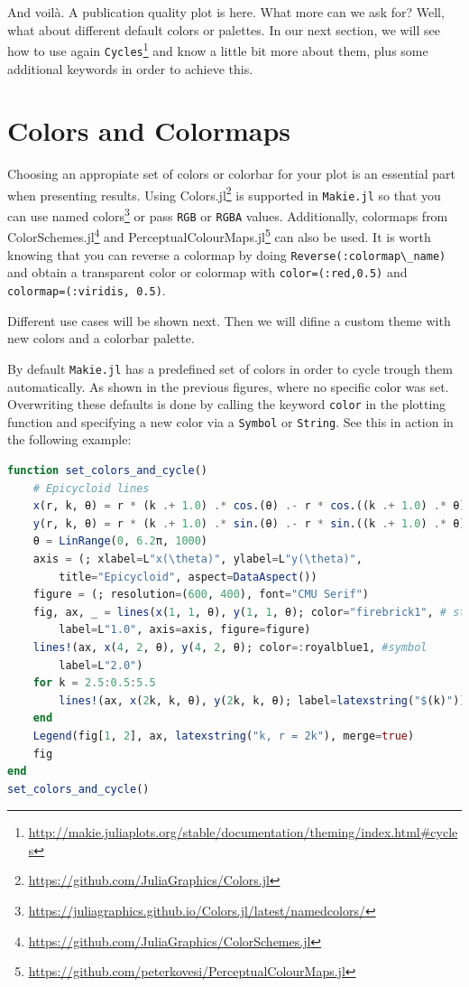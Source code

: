 \documentclass[
  notoc %
]{tufte-book}
\DeclareRobustCommand{\href}[2]{#2\footnote{\url{#1}}}
\newcommand{\passthrough}[1]{#1}
\begin{document}
And voilà. A publication quality plot is here. What more can we ask for?
Well, what about different default colors or palettes. In our next
section, we will see how to use again
\href{http://makie.juliaplots.org/stable/documentation/theming/index.html\#cycles}{\passthrough{\lstinline!Cycles!}}
and know a little bit more about them, plus some additional keywords in
order to achieve this.

\hypertarget{sec:makie_colors}{%
\section{Colors and Colormaps}\label{sec:makie_colors}}

Choosing an appropiate set of colors or colorbar for your plot is an
essential part when presenting results. Using
\href{https://github.com/JuliaGraphics/Colors.jl}{Colors.jl} is
supported in \passthrough{\lstinline!Makie.jl!} so that you can use
\href{https://juliagraphics.github.io/Colors.jl/latest/namedcolors/}{named
colors} or pass \passthrough{\lstinline!RGB!} or
\passthrough{\lstinline!RGBA!} values. Additionally, colormaps from
\href{https://github.com/JuliaGraphics/ColorSchemes.jl}{ColorSchemes.jl}
and
\href{https://github.com/peterkovesi/PerceptualColourMaps.jl}{PerceptualColourMaps.jl}
can also be used. It is worth knowing that you can reverse a colormap by
doing \passthrough{\lstinline!Reverse(:colormap\_name)!} and obtain a
transparent color or colormap with
\passthrough{\lstinline!color=(:red,0.5)!} and
\passthrough{\lstinline!colormap=(:viridis, 0.5)!}.

Different use cases will be shown next. Then we will difine a custom
theme with new colors and a colorbar palette.

By default \passthrough{\lstinline!Makie.jl!} has a predefined set of
colors in order to cycle trough them automatically. As shown in the
previous figures, where no specific color was set. Overwriting these
defaults is done by calling the keyword \passthrough{\lstinline!color!}
in the plotting function and specifying a new color via a
\passthrough{\lstinline!Symbol!} or \passthrough{\lstinline!String!}.
See this in action in the following example:

\begin{lstlisting}[language=Julia]
function set_colors_and_cycle()
    # Epicycloid lines
    x(r, k, θ) = r * (k .+ 1.0) .* cos.(θ) .- r * cos.((k .+ 1.0) .* θ)
    y(r, k, θ) = r * (k .+ 1.0) .* sin.(θ) .- r * sin.((k .+ 1.0) .* θ)
    θ = LinRange(0, 6.2π, 1000)
    axis = (; xlabel=L"x(\theta)", ylabel=L"y(\theta)",
        title="Epicycloid", aspect=DataAspect())
    figure = (; resolution=(600, 400), font="CMU Serif")
    fig, ax, _ = lines(x(1, 1, θ), y(1, 1, θ); color="firebrick1", # string
        label=L"1.0", axis=axis, figure=figure)
    lines!(ax, x(4, 2, θ), y(4, 2, θ); color=:royalblue1, #symbol
        label=L"2.0")
    for k = 2.5:0.5:5.5
        lines!(ax, x(2k, k, θ), y(2k, k, θ); label=latexstring("$(k)")) #cycle
    end
    Legend(fig[1, 2], ax, latexstring("k, r = 2k"), merge=true)
    fig
end
set_colors_and_cycle()
\end{lstlisting}
\end{document}
